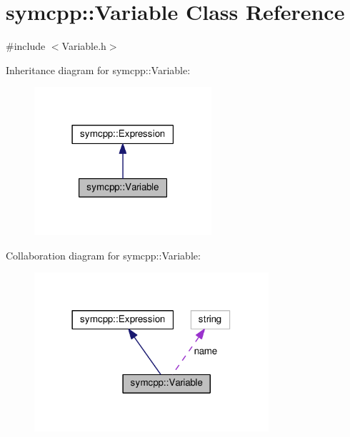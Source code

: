 \hypertarget{classsymcpp_1_1Variable}{}\section{symcpp\+:\+:Variable Class Reference}
\label{classsymcpp_1_1Variable}


{\ttfamily \#include $<$Variable.\+h$>$}



Inheritance diagram for symcpp\+:\+:Variable\+:\nopagebreak
\begin{figure}[H]
\begin{center}
\leavevmode
\includegraphics[width=186pt]{classsymcpp_1_1Variable__inherit__graph}
\end{center}
\end{figure}


Collaboration diagram for symcpp\+:\+:Variable\+:\nopagebreak
\begin{figure}[H]
\begin{center}
\leavevmode
\includegraphics[width=246pt]{classsymcpp_1_1Variable__coll__graph}
\end{center}
\end{figure}
